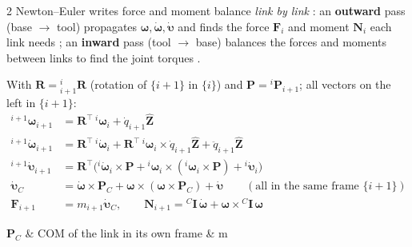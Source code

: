 \begin{multicols}{2}
\label{w7:nepass}
Newton--Euler writes force and moment balance \emph{link by link} : an \textbf{outward} pass (base $\to$ tool) propagates $\boldsymbol\omega,\dot{\boldsymbol\omega},\dot{\boldsymbol\upsilon}$ and finds the force $\mathbf F_i$ and moment $\mathbf N_i$ each link needs ; an \textbf{inward} pass (tool $\to$ base) balances the forces and moments between links to find the joint torques .
\begin{fbx}[Outward pass, $i=0\to n-1$, revolute joint $i{+}1$ (Craig form; joint axis $\hat{\mathbf Z}=(0,0,1)^\top$) \added]
With $\mathbf R={}^{i}_{i+1}\mathbf R$ (rotation of $\{i{+}1\}$ in $\{i\}$) and $\mathbf P={}^{i}\mathbf P_{i+1}$; all vectors on the left in $\{i{+}1\}$:
\begin{align*}
{}^{i+1}\boldsymbol\omega_{i+1}&=\mathbf R^\top\,{}^i\boldsymbol\omega_i+\dot q_{i+1}\hat{\mathbf Z}\\
{}^{i+1}\dot{\boldsymbol\omega}_{i+1}&=\mathbf R^\top\,{}^i\dot{\boldsymbol\omega}_i+\mathbf R^\top\,{}^i\boldsymbol\omega_i\times\dot q_{i+1}\hat{\mathbf Z}+\ddot q_{i+1}\hat{\mathbf Z}\\
{}^{i+1}\dot{\boldsymbol\upsilon}_{i+1}&=\mathbf R^\top\big({}^i\dot{\boldsymbol\omega}_i\times\mathbf P+{}^i\boldsymbol\omega_i\times({}^i\boldsymbol\omega_i\times\mathbf P)+{}^i\dot{\boldsymbol\upsilon}_i\big)\\
\dot{\boldsymbol\upsilon}_{C}&=\dot{\boldsymbol\omega}\times\mathbf P_C+\boldsymbol\omega\times(\boldsymbol\omega\times\mathbf P_C)+\dot{\boldsymbol\upsilon}\qquad(\text{all in the same frame }\{i{+}1\})\\
\mathbf F_{i+1}&=m_{i+1}\dot{\boldsymbol\upsilon}_C,\qquad \mathbf N_{i+1}={}^C\mathbf I\,\dot{\boldsymbol\omega}+\boldsymbol\omega\times{}^C\mathbf I\,\boldsymbol\omega
\end{align*}
\begin{symbols}
$\mathbf P_C$ & COM of the link in its own frame & m\\

\end{symbols}
\end{fbx}
\end{multicols}
